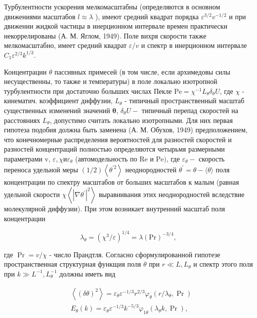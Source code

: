 \documentclass[10pt]{article}
\begin{document}
Турбулентности ускорения мелкомасштабны (определяются в основном движениями масштабов $l \approx \lambda$ ), имеют средний квадрат порядка $\varepsilon^{3 / 2} v^{-1 / 2}$ и при движении жидкой частицы в инерционном интервале времен практически некоррелированы (А. М. Яглом, 1949). Поле вихря скорости также мелкомасштабно, имеет средний квадрат $\varepsilon / v$ и спектр в инерционном интервале $C_{1} \varepsilon^{2 / 3} k^{1 / 3}$.



Концентрации $\theta$ пассивных примесей (в том числе, если архимедовы силы несущественны, то также и температуры) в поле локально изотропной турбулентности при достаточно болыших числах Пекле $\mathrm{Pe}=\chi^{-1} L_{\theta} \delta_{\theta} U$, где $\chi$ - кинематич. коэффициент диффузии, $L_{\theta}$ - типичный пространственный масштаб существенных изменений значений $\boldsymbol{\theta}$, $\delta_{\theta} U-$ типичный перепад скоростей на расстояниях $L_{\theta}$, допустимо считать локально изотропными. Для них первая гипотеза подобия должна быть заменена (А. М. Обухов, 1949) предположением, что конечномерные распределения вероятностей для разностей скоростей и разностей концентраций полностью определяются четырьмя размерными параметрами v, $\varepsilon, \chi и \varepsilon_{\theta}$ (автомодельность по Re и $\mathrm{P} \mathrm{e})$, где $\varepsilon_{\theta}-$ скорость переноса удельной меры $(1 / 2)\left\langle\theta^{\prime 2}\right\rangle$ неоднородностей $\theta^{\prime}=\theta-\langle\theta\rangle$ поля концентрации по спектру масштабов от больших масштабов к малым (равная удельной скорости $\chi\left\langle\left|\nabla \theta^{\prime}\right|^{2}\right\rangle$ выравнивания этих неоднородностей вследствие молекулярной диффузии). При этом возникает внутренний масштаб поля концентрации



\[

\lambda_{\theta}=\left(\chi^{3} / \varepsilon\right)^{1 / 4}=\lambda(\mathrm{Pr})^{-3 / 4},

\]



где $\operatorname{Pr}=v / \chi$ - число Прандтля. Согласно сформулированной гипотезе пространственная структурная функщия поля $\theta$ при $r \ll L, L_{\theta}$ и спектр этого поля при $k \gg L^{-1}, L_{\theta}^{-1}$ должны иметь вид



\[

\begin{aligned}

& \left\langle(\delta \theta)^{2}\right\rangle=\varepsilon_{\theta} \varepsilon^{-1 / 3} r^{2 / 3} \varphi_{\theta}\left(r / \lambda_{\theta}, \operatorname{Pr}\right) \\

& E_{\theta}(k)=\varepsilon_{\theta} \varepsilon^{-1 / 3} k^{-5 / 3} \varphi_{1 \theta}\left(\lambda_{\theta} k, \operatorname{Pr}\right),

\end{aligned}

\]
\end{document}
